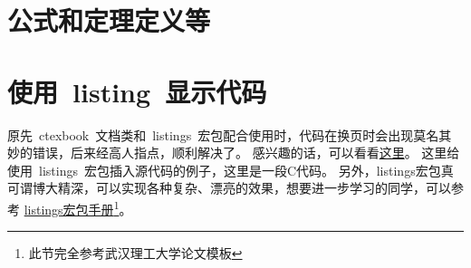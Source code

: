 \section{公式和定理定义等}
	\section{使用~listing~显示代码}
原先~ctexbook~文档类和~listings~宏包配合使用时，代码在换页时会出现莫名其妙的错误，后来经高人指点，顺利解决了。
感兴趣的话，可以看看\href{http://bbs.ctex.org/viewthread.php?tid=53451}{这里}。
这里给使用~listings~宏包插入源代码的例子，这里是一段C代码。
另外，listings宏包真可谓博大精深，可以实现各种复杂、漂亮的效果，想要进一步学习的同学，可以参考
\href{http://mirror.ctan.org/macros/latex/contrib/listings/listings.pdf}{listings宏包手册\footnote{此节完全参考武汉理工大学论文模板}}。